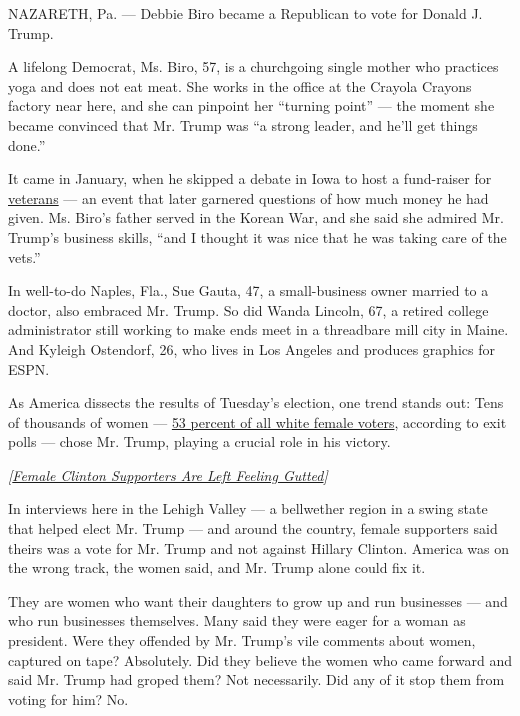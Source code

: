 NAZARETH, Pa. --- Debbie Biro became a Republican to vote for Donald J.
Trump.

A lifelong Democrat, Ms. Biro, 57, is a churchgoing single mother who
practices yoga and does not eat meat. She works in the office at the
Crayola Crayons factory near here, and she can pinpoint her ``turning
point'' --- the moment she became convinced that Mr. Trump was ``a
strong leader, and he'll get things done.''

It came in January, when he skipped a debate in Iowa to host a
fund-raiser for
\href{http://www.nytimes.com/2016/11/03/us/politics/donald-trump-veterans.html}{veterans}
--- an event that later garnered questions of how much money he had
given. Ms. Biro's father served in the Korean War, and she said she
admired Mr. Trump's business skills, ``and I thought it was nice that he
was taking care of the vets.''

In well-to-do Naples, Fla., Sue Gauta, 47, a small-business owner
married to a doctor, also embraced Mr. Trump. So did Wanda Lincoln, 67,
a retired college administrator still working to make ends meet in a
threadbare mill city in Maine. And Kyleigh Ostendorf, 26, who lives in
Los Angeles and produces graphics for ESPN.

As America dissects the results of Tuesday's election, one trend stands
out: Tens of thousands of women ---
\href{http://www.nytimes.com/2016/12/01/us/politics/white-women-helped-elect-donald-trump.html}{53
percent of all white female voters}, according to exit polls --- chose
Mr. Trump, playing a crucial role in his victory.

\emph{{[}}\href{http://www.nytimes.com/2016/11/11/us/politics/female-clinton-supporters-are-left-feeling-gutted.html}{\emph{Female
Clinton Supporters Are Left Feeling Gutted}}\emph{{]}}

In interviews here in the Lehigh Valley --- a bellwether region in a
swing state that helped elect Mr. Trump --- and around the country,
female supporters said theirs was a vote for Mr. Trump and not against
Hillary Clinton. America was on the wrong track, the women said, and Mr.
Trump alone could fix it.

They are women who want their daughters to grow up and run businesses
--- and who run businesses themselves. Many said they were eager for a
woman as president. Were they offended by Mr. Trump's vile comments
about women, captured on tape? Absolutely. Did they believe the women
who came forward and said Mr. Trump had groped them? Not necessarily.
Did any of it stop them from voting for him? No.

